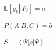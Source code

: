 \documentclass{article}
\begin{document}
$\mathbb{E}\left[\left.g_{k}\right|\ F_{t}\right]=a$

$P\left(\left.A\right|B,C\right)=b$

$S=\left<\Psi\right|\rho\left|\Psi\right>$
\end{document}
